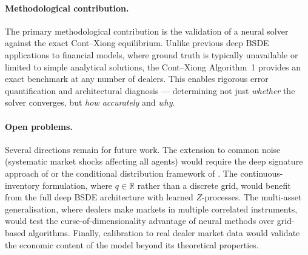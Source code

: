 \paragraph{Methodological contribution.}
The primary methodological contribution is the validation of a
neural solver against the exact Cont--Xiong equilibrium.  Unlike
previous deep BSDE applications to financial models, where ground
truth is typically unavailable or limited to simple analytical
solutions, the Cont--Xiong Algorithm~1 provides an exact benchmark
at any number of dealers.  This enables rigorous error quantification
and architectural diagnosis --- determining not just \emph{whether}
the solver converges, but \emph{how accurately} and \emph{why}.

\paragraph{Open problems.}
Several directions remain for future work.  The extension to
common noise (systematic market shocks affecting all agents) would
require the deep signature approach of \citet{hu2025} or the
conditional distribution framework of \citet{carmona2018a}.  The
continuous-inventory formulation, where $q \in \mathbb{R}$ rather
than a discrete grid, would benefit from the full deep BSDE
architecture with learned $Z$-processes.  The multi-asset
generalisation, where dealers make markets in multiple correlated
instruments, would test the curse-of-dimensionality advantage of
neural methods over grid-based algorithms.  Finally, calibration
to real dealer market data would validate the economic content of
the model beyond its theoretical properties.
